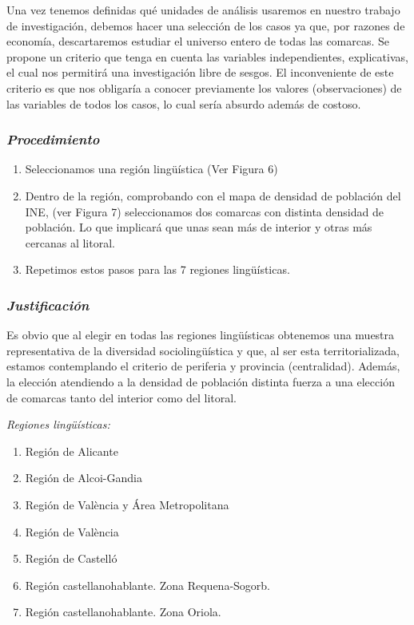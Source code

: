 \documentclass[
]{article}
\providecommand{\tightlist}{%
  \setlength{\itemsep}{0pt}\setlength{\parskip}{0pt}}
\begin{document}
Una vez tenemos definidas qué unidades de análisis usaremos en nuestro
trabajo de investigación, debemos hacer una selección de los casos ya
que, por razones de economía, descartaremos estudiar el universo entero
de todas las comarcas. Se propone un criterio que tenga en cuenta las
variables independientes, explicativas, el cual nos permitirá una
investigación libre de sesgos. El inconveniente de este criterio es que
nos obligaría a conocer previamente los valores (observaciones) de las
variables de todos los casos, lo cual sería absurdo además de costoso.

\hypertarget{procedimiento}{%
\subsubsection{\texorpdfstring{\emph{Procedimiento}}{Procedimiento}}\label{procedimiento}}

\begin{enumerate}
\def\labelenumi{\arabic{enumi}.}
\tightlist
\item
  Seleccionamos una región lingüística (Ver Figura 6)
\item
  Dentro de la región, comprobando con el mapa de densidad de población
  del INE, (ver Figura 7) seleccionamos dos comarcas con distinta
  densidad de población. Lo que implicará que unas sean más de interior
  y otras más cercanas al litoral.
\item
  Repetimos estos pasos para las 7 regiones lingüísticas.
\end{enumerate}

\hypertarget{justificaciuxf3n}{%
\subsubsection{\texorpdfstring{\emph{Justificación}}{Justificación}}\label{justificaciuxf3n}}

Es obvio que al elegir en todas las regiones lingüísticas obtenemos una
muestra representativa de la diversidad sociolingüística y que, al ser
esta territorializada, estamos contemplando el criterio de periferia y
provincia (centralidad). Además, la elección atendiendo a la densidad de
población distinta fuerza a una elección de comarcas tanto del interior
como del litoral.

\emph{Regiones lingüísticas:}

\begin{enumerate}
\def\labelenumi{\arabic{enumi}.}
\tightlist
\item
  Región de Alicante
\item
  Región de Alcoi-Gandia
\item
  Región de València y Área Metropolitana
\item
  Región de València
\item
  Región de Castelló
\item
  Región castellanohablante. Zona Requena-Sogorb.
\item
  Región castellanohablante. Zona Oriola.
\end{enumerate}
\end{document}
